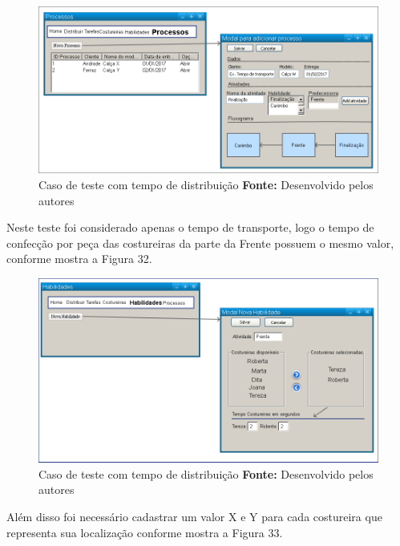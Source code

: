 \begin{figure}[h!]
	\centerline{\includegraphics[scale=0.3]{./imagens/test_case_2.png}}
	\caption[Caso de teste com tempo de distribuição]
	{Caso de teste com tempo de distribuição \textbf{Fonte:} Desenvolvido pelos autores}
	\label{fig:exemplo1}
\end{figure}


\par Neste teste foi considerado apenas o tempo de transporte, logo o tempo de confecção por peça das costureiras da parte 
da Frente possuem o mesmo valor, conforme mostra a Figura 32.


\begin{figure}[h!]
	\centerline{\includegraphics[scale=0.3]{./imagens/test_case_2_habilidades.png}}
	\caption[Caso de teste com tempo de distribuição]
	{Caso de teste com tempo de distribuição \textbf{Fonte:} Desenvolvido pelos autores}
	\label{fig:exemplo1}
\end{figure}

\newpage

\par Além disso foi necessário cadastrar um valor X e Y para cada costureira que representa sua localização conforme 
mostra a Figura 33.


